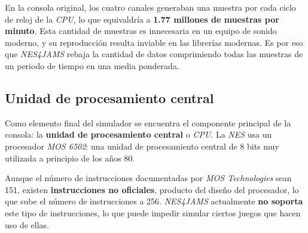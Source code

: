 En la consola original, los cuatro canales generaban una muestra
por cada ciclo de reloj de la \textit{CPU}, lo que equivaldría
a \textbf{1.77 millones de muestras por minuto}.
Esta cantidad de muestras es innecesaria en un equipo de sonido
moderno, y su reproducción resulta inviable en las librerías
modernas.
Es por eso que \textit{NES4JAMS} rebaja la cantidad de datos comprimiendo
todas las muestras de un periodo de tiempo en una media ponderada.

\subsection{Unidad de procesamiento central}\label{subsec:unidad-de-procesamiento-central}

Como elemento final del simulador se encuentra el componente
principal de la consola: la \textbf{unidad de procesamiento central}
o \textit{CPU}.
La \textit{NES} usa un procesador \textit{MOS 6502}: una unidad
de procesamiento central de 8 bits muy utilizada a principio
de los años 80.

Aunque el número de instrucciones documentadas por \textit{MOS Technologies}
sean 151, existen \textbf{instrucciones no oficiales}, producto del diseño
del procesador, lo que sube el número de instrucciones a 256.
\textit{NES4JAMS} actualmente \textbf{no soporta} este tipo de instrucciones,
lo que puede impedir simular ciertos juegos que hacen uso de ellas.

